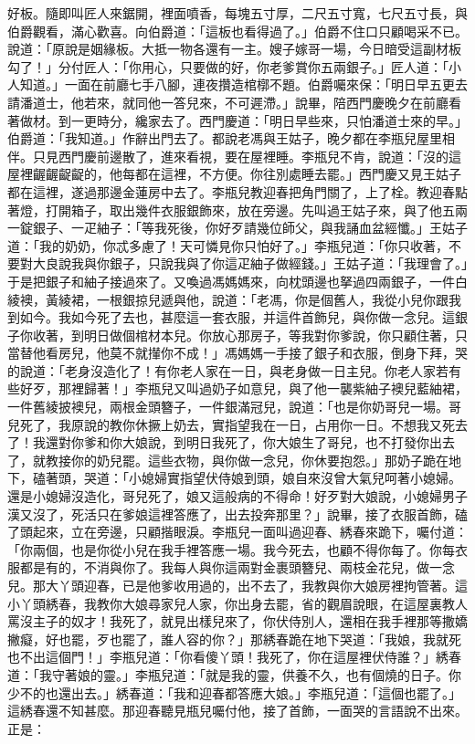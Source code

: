 \begin{showcontents}{}
好板。隨即叫匠人來鋸開，裡面噴香，每塊五寸厚，二尺五寸寬，七尺五寸長，與伯爵觀看，滿心歡喜。向伯爵道：「這板也看得過了。」伯爵不住口只顧喝采不已。說道：「原說是姻緣板。大抵一物各還有一主。嫂子嫁哥一場，今日暗受這副材板勾了！」分付匠人：「你用心，只要做的好，你老爹賞你五兩銀子。」匠人道：「小人知道。」一面在前廳七手八腳，連夜攢造棺槨不題。伯爵囑來保：「明日早五更去請潘道士，他若來，就同他一答兒來，不可遲滯。」說畢，陪西門慶晚夕在前廳看著做材。到一更時分，纔家去了。西門慶道：「明日早些來，只怕潘道士來的早。」伯爵道：「我知道。」作辭出門去了。都說老馮與王姑子，晚夕都在李瓶兒屋里相伴。只見西門慶前邊散了，進來看視，要在屋裡睡。李瓶兒不肯，說道：「沒的這屋裡齷齷齪齪的，他每都在這裡，不方便。你往別處睡去罷。」西門慶又見王姑子都在這裡，遂過那邊金蓮房中去了。李瓶兒教迎春把角門關了，上了栓。教迎春點著燈，打開箱子，取出幾件衣服銀飾來，放在旁邊。先叫過王姑子來，與了他五兩一錠銀子、一疋紬子：「等我死後，你好歹請幾位師父，與我誦血盆經懺。」王姑子道：「我的奶奶，你忒多慮了！天可憐見你只怕好了。」李瓶兒道：「你只收著，不要對大良說我與你銀子，只說我與了你這疋紬子做經錢。」王姑子道：「我理會了。」于是把銀子和紬子接過來了。又喚過馮媽媽來，向枕頭邊也拏過四兩銀子，一件白綾襖，黃綾裙，一根銀掠兒遞與他，說道：「老馮，你是個舊人，我從小兒你跟我到如今。我如今死了去也，甚麼這一套衣服，并這件首飾兒，與你做一念兒。這銀子你收著，到明日做個棺材本兒。你放心那房子，等我對你爹說，你只顧住著，只當替他看房兒，他莫不就攆你不成！」馮媽媽一手接了銀子和衣服，倒身下拜，哭的說道：「老身沒造化了！有你老人家在一日，與老身做一日主兒。你老人家若有些好歹，那裡歸著！」李瓶兒又叫過奶子如意兒，與了他一襲紫紬子襖兒藍紬裙，一件舊綾披襖兒，兩根金頭簪子，一件銀滿冠兒，說道：「也是你奶哥兒一場。哥兒死了，我原說的教你休撅上奶去，實指望我在一日，占用你一日。不想我又死去了！我還對你爹和你大娘說，到明日我死了，你大娘生了哥兒，也不打發你出去了，就教接你的奶兒罷。這些衣物，與你做一念兒，你休要抱怨。」那奶子跪在地下，磕著頭，哭道：「小媳婦實指望伏侍娘到頭，娘自來沒曾大氣兒呵著小媳婦。還是小媳婦沒造化，哥兒死了，娘又這般病的不得命！好歹對大娘說，小媳婦男子漢又沒了，死活只在爹娘這裡答應了，出去投奔那里？」說畢，接了衣服首飾，磕了頭起來，立在旁邊，只顧揩眼淚。李瓶兒一面叫過迎春、綉春來跪下，囑付道：「你兩個，也是你從小兒在我手裡答應一場。我今死去，也顧不得你每了。你每衣服都是有的，不消與你了。我每人與你這兩對金裹頭簪兒、兩枝金花兒，做一念兒。那大丫頭迎春，已是他爹收用過的，出不去了，我教與你大娘房裡拘管著。這小丫頭綉春，我教你大娘尋家兒人家，你出身去罷，省的觀眉說眼，在這屋裏教人罵沒主子的奴才！我死了，就見出樣兒來了，你伏侍別人，還相在我手裡那等撒嬌撇癡，好也罷，歹也罷了，誰人容的你？」那綉春跪在地下哭道：「我娘，我就死也不出這個門！」李瓶兒道：「你看傻丫頭！我死了，你在這屋裡伏侍誰？」綉春道：「我守著娘的靈。」李瓶兒道：「就是我的靈，供養不久，也有個燒的日子。你少不的也還出去。」綉春道：「我和迎春都答應大娘。」李瓶兒道：「這個也罷了。」這綉春還不知甚麼。那迎春聽見瓶兒囑付他，接了首飾，一面哭的言語說不出來。正是：


\end{showcontents}
